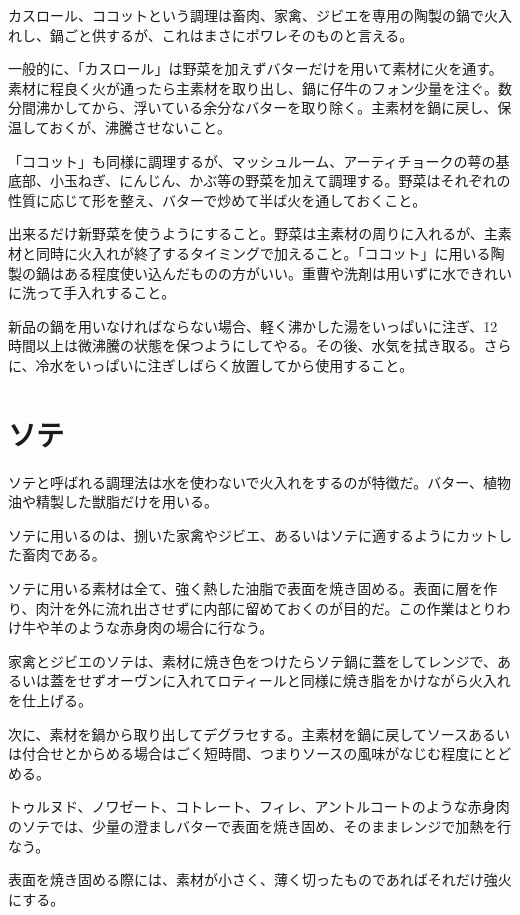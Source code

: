 カスロール、ココットという調理は畜肉、家禽、ジビエを専用の陶製の鍋で火入れし、鍋ごと供するが、これはまさにポワレそのものと言える。

一般的に、「カスロール」は野菜を加えずバターだけを用いて素材に火を通す。素材に程良く火が通ったら主素材を取り出し、鍋に仔牛のフォン少量を注ぐ。数分間沸かしてから、浮いている余分なバターを取り除く。主素材を鍋に戻し、保温しておくが、沸騰させないこと。

「ココット」も同様に調理するが、マッシュルーム、アーティチョークの萼の基底部、小玉ねぎ、にんじん、かぶ等の野菜を加えて調理する。野菜はそれぞれの性質に応じて形を整え、バターで炒めて半ば火を通しておくこと。

出来るだけ新野菜を使うようにすること。野菜は主素材の周りに入れるが、主素材と同時に火入れが終了するタイミングで加えること。「ココット」に用いる陶製の鍋はある程度使い込んだものの方がいい。重曹や洗剤は用いずに水できれいに洗って手入れすること。

新品の鍋を用いなければならない場合、軽く沸かした湯をいっぱいに注ぎ、12
時間以上は微沸騰の状態を保つようにしてやる。その後、水気を拭き取る。さらに、冷水をいっぱいに注ぎしばらく放置してから使用すること。

\hypertarget{ux30bdux30c6}{%
\section{ソテ}\label{ux30bdux30c6}}

ソテと呼ばれる調理法は水を使わないで火入れをするのが特徴だ。バター、植物油や精製した獣脂だけを用いる。

ソテに用いるのは、捌いた家禽やジビエ、あるいはソテに適するようにカットした畜肉である。

ソテに用いる素材は全て、強く熱した油脂で表面を焼き固める。表面に層を作り、肉汁を外に流れ出させずに内部に留めておくのが目的だ。この作業はとりわけ牛や羊のような赤身肉の場合に行なう。

家禽とジビエのソテは、素材に焼き色をつけたらソテ鍋に蓋をしてレンジで、あるいは蓋をせずオーヴンに入れてロティールと同様に焼き脂をかけながら火入れを仕上げる。

次に、素材を鍋から取り出してデグラセする。主素材を鍋に戻してソースあるいは付合せとからめる場合はごく短時間、つまりソースの風味がなじむ程度にとどめる。

トゥルヌド、ノワゼート、コトレート、フィレ、アントルコートのような赤身肉のソテでは、少量の澄ましバターで表面を焼き固め、そのままレンジで加熱を行なう。

表面を焼き固める際には、素材が小さく、薄く切ったものであればそれだけ強火にする。

